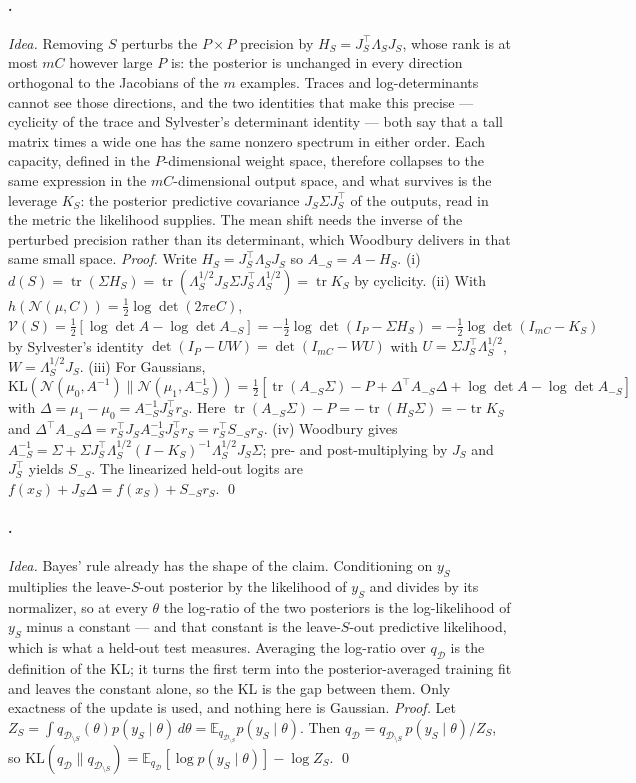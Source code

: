 \documentclass[10pt,twocolumn,letterpaper]{article}
\theoremstyle{definition}
\newcommand{\KL}{\mathrm{KL}}
\newcommand{\tr}{\operatorname{tr}}
\newcommand{\logdet}{\log\det}
\newcommand{\Vol}{\mathcal{V}}
\newcommand{\N}{\mathcal{N}}
\newcommand{\D}{\mathcal{D}}
\newcommand{\DS}{\mathcal{D}_{\setminus S}}
\newcommand{\T}{^{\top}}
\newcommand{\dof}{d}
\begin{document}
\paragraph{.} \emph{Idea.} Removing $S$ perturbs the $P\times P$ precision by $H_S=J_S\T\Lambda_SJ_S$, whose rank is at most $mC$ however large $P$ is: the posterior is unchanged in every direction orthogonal to the Jacobians of the $m$ examples. Traces and log-determinants cannot see those directions, and the two identities that make this precise --- cyclicity of the trace and Sylvester's determinant identity --- both say that a tall matrix times a wide one has the same nonzero spectrum in either order. Each capacity, defined in the $P$-dimensional weight space, therefore collapses to the same expression in the $mC$-dimensional output space, and what survives is the leverage $K_S$: the posterior predictive covariance $J_S\Sigma J_S\T$ of the outputs, read in the metric the likelihood supplies. The mean shift needs the inverse of the perturbed precision rather than its determinant, which Woodbury delivers in that same small space. \emph{Proof.} Write $H_S=J_S\T\Lambda_SJ_S$ so $A_{-S}=A-H_S$. (i) $\dof(S)=\tr(\Sigma H_S)=\tr(\Lambda_S^{1/2}J_S\Sigma J_S\T\Lambda_S^{1/2})=\tr K_S$ by cyclicity. (ii) With $h(\N(\mu,C))=\tfrac12\logdet(2\pi eC)$, $\Vol(S)=\tfrac12[\logdet A-\logdet A_{-S}]=-\tfrac12\logdet(I_P-\Sigma H_S)=-\tfrac12\logdet(I_{mC}-K_S)$ by Sylvester's identity $\det(I_P-UW)=\det(I_{mC}-WU)$ with $U=\Sigma J_S\T\Lambda_S^{1/2}$, $W=\Lambda_S^{1/2}J_S$. (iii) For Gaussians, $\KL(\N(\mu_0,A^{-1})\|\N(\mu_1,A_{-S}^{-1}))=\tfrac12[\tr(A_{-S}\Sigma)-P+\Delta\T A_{-S}\Delta+\logdet A-\logdet A_{-S}]$ with $\Delta=\mu_1-\mu_0=A_{-S}^{-1}J_S\T r_S$. Here $\tr(A_{-S}\Sigma)-P=-\tr(H_S\Sigma)=-\tr K_S$ and $\Delta\T A_{-S}\Delta=r_S\T J_SA_{-S}^{-1}J_S\T r_S=r_S\T S_{-S}r_S$. (iv) Woodbury gives $A_{-S}^{-1}=\Sigma+\Sigma J_S\T\Lambda_S^{1/2}(I-K_S)^{-1}\Lambda_S^{1/2}J_S\Sigma$; pre- and post-multiplying by $J_S$ and $J_S\T$ yields $S_{-S}$. The linearized held-out logits are $f(x_S)+J_S\Delta=f(x_S)+S_{-S}r_S$. \qed

\paragraph{.} \emph{Idea.} Bayes' rule already has the shape of the claim. Conditioning on $y_S$ multiplies the leave-$S$-out posterior by the likelihood of $y_S$ and divides by its normalizer, so at every $\theta$ the log-ratio of the two posteriors is the log-likelihood of $y_S$ minus a constant --- and that constant is the leave-$S$-out predictive likelihood, which is what a held-out test measures. Averaging the log-ratio over $q_\D$ is the definition of the KL; it turns the first term into the posterior-averaged training fit and leaves the constant alone, so the KL is the gap between them. Only exactness of the update is used, and nothing here is Gaussian. \emph{Proof.} Let $Z_S=\int q_{\DS}(\theta)p(y_S\mid\theta)\,d\theta=\mathbb{E}_{q_{\DS}}p(y_S\mid\theta)$. Then $q_\D=q_{\DS}\,p(y_S\mid\theta)/Z_S$, so $\KL(q_\D\|q_{\DS})=\mathbb{E}_{q_\D}[\log p(y_S\mid\theta)]-\log Z_S$. \qed
\end{document}
